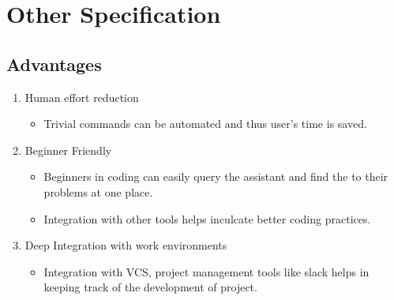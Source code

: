 \documentclass[oneside,a4paper,12pt, times]{book}
\begin{document}
\chapter{Other Specification}
\section{Advantages}
\begin{enumerate}
    \item Human effort reduction
    \begin{itemize}
        \item Trivial commands can be automated and thus user's time is saved. 
    \end{itemize}
    
    \item Beginner Friendly
    \begin{itemize}
        \item Beginners in coding can easily query the assistant and find the to their problems at one place.
        \item Integration with other tools helps inculcate better coding practices.
    \end{itemize}
    \item Deep Integration with work environments
    \begin{itemize}
        \item Integration with VCS, project management tools like slack helps in keeping track of the development of project. 
    \end{itemize}
\end{enumerate}
\end{document}
